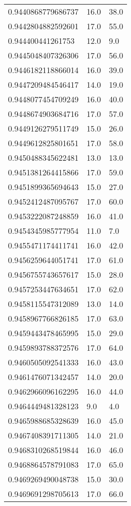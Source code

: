 \begin{center}
\begin{supertabular}[H]{p{0.30\textwidth}p{0.05\textwidth}p{0.05\textwidth}}
0.9440868779686737 & 16.0 & 38.0 \\ 
0.9442804882592601 & 17.0 & 55.0 \\ 
0.944400441261753 & 12.0 & 9.0 \\ 
0.9445048407326306 & 17.0 & 56.0 \\ 
0.9446182118866014 & 16.0 & 39.0 \\ 
0.9447209484546417 & 14.0 & 19.0 \\ 
0.9448077454709249 & 16.0 & 40.0 \\ 
0.9448674903684716 & 17.0 & 57.0 \\ 
0.9449126279511749 & 15.0 & 26.0 \\ 
0.9449612825801651 & 17.0 & 58.0 \\ 
0.9450488345622481 & 13.0 & 13.0 \\ 
0.9451381264415866 & 17.0 & 59.0 \\ 
0.9451899365694643 & 15.0 & 27.0 \\ 
0.9452412487095767 & 17.0 & 60.0 \\ 
0.9453222087248859 & 16.0 & 41.0 \\ 
0.9454345985777954 & 11.0 & 7.0 \\ 
0.9455471174411741 & 16.0 & 42.0 \\ 
0.9456259644051741 & 17.0 & 61.0 \\ 
0.9456755743657617 & 15.0 & 28.0 \\ 
0.9457253447634651 & 17.0 & 62.0 \\ 
0.9458115547312089 & 13.0 & 14.0 \\ 
0.9458967766826185 & 17.0 & 63.0 \\ 
0.9459443478465995 & 15.0 & 29.0 \\ 
0.9459893788372576 & 17.0 & 64.0 \\ 
0.9460505092541333 & 16.0 & 43.0 \\ 
0.9461476071342457 & 14.0 & 20.0 \\ 
0.9462966096162295 & 16.0 & 44.0 \\ 
0.9464449481328123 & 9.0 & 4.0 \\ 
0.9465988685328639 & 16.0 & 45.0 \\ 
0.9467408391711305 & 14.0 & 21.0 \\ 
0.9468310268519844 & 16.0 & 46.0 \\ 
0.9468864578791083 & 17.0 & 65.0 \\ 
0.9469269490048738 & 15.0 & 30.0 \\ 
0.9469691298705613 & 17.0 & 66.0 \\ 

\end{supertabular}
\end{center}
